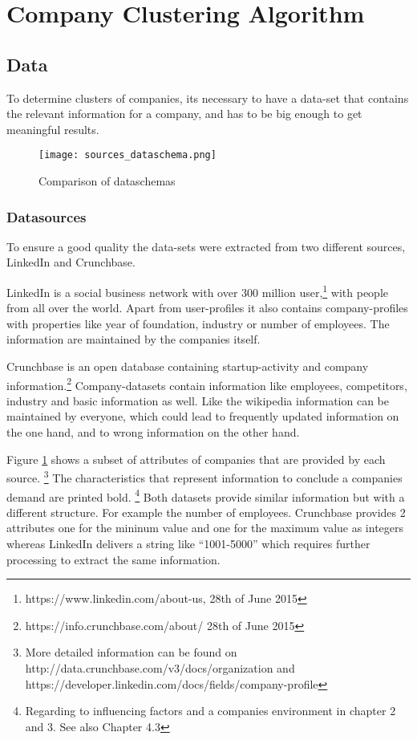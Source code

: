 \section{Company Clustering Algorithm}

\subsection{Data}
To determine clusters of companies, its necessary to have a data-set that contains the relevant information
for a company, and has to be big enough to get meaningful results.

\begin{figure}[ht]
\texttt{[image: sources\_dataschema.png]}
\centering
\caption{Comparison of dataschemas}
\label{fig:sourcesSchemas}
\end{figure}

\subsubsection{Datasources}
To ensure a good quality the data-sets were extracted from two different sources, LinkedIn and Crunchbase.

LinkedIn is a social business network with over 300 million user,\footnote{https://www.linkedin.com/about-us, 28th of June 2015} with people from all over the world. Apart
from user-profiles it also contains company-profiles with properties like year of foundation, industry or
number of employees. The information are maintained by the companies itself.

Crunchbase is an open database containing startup-activity and company information.\footnote{https://info.crunchbase.com/about/ 28th of June 2015} Company-datasets contain information
like employees, competitors, industry and basic information as well. Like the wikipedia information can be maintained by everyone,
which could lead to frequently updated information on the one hand, and to wrong information on the other hand.

Figure \ref{fig:sourcesSchemas} shows a subset of attributes of companies that are provided by each source. \footnote{More detailed information can be found on http://data.crunchbase.com/v3/docs/organization and https://developer.linkedin.com/docs/fields/company-profile }
The characteristics that represent information to conclude a companies demand are printed bold. \footnote{Regarding to influencing factors
and a companies environment in chapter 2 and 3. See also Chapter 4.3} Both datasets provide similar information but with a different structure.
For example the number of employees. Crunchbase provides 2 attributes one for the mininum value and one for the maximum value as integers
whereas LinkedIn delivers a string like ``1001-5000'' which requires further processing to extract the same information.

